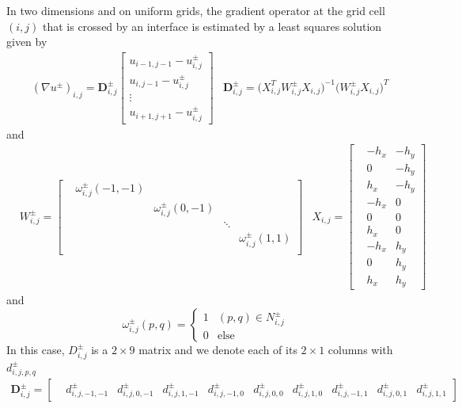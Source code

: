 \documentclass{elsarticle}
\begin{document}
In two dimensions and on uniform grids, the gradient operator at the grid cell $(i,j)$ that is crossed by an interface is estimated by a least squares solution given by
\begin{align*}
&(\nabla u^\pm)_{i,j} = \mathbf{D}^\pm_{i,j} \begin{bmatrix}
u_{i-1,j-1} - u^\pm_{i,j}\\
u_{i,j-1} - u^\pm_{i,j}\\
\vdots \\
u_{i+1,j+1} - u^\pm_{i,j}
\end{bmatrix} &\mathbf{D}^\pm_{i,j} = \big(X^T_{i,j} W^\pm_{i,j} X_{i,j} \big)^{-1} \big( W^\pm_{i,j} X_{i,j} \big)^T
\end{align*}
and 
\begin{align*}
& W^\pm_{i,j} = \begin{bmatrix}
&\omega^\pm_{i,j} (-1,-1) &  &  & \\
& &\omega^\pm_{i,j} (0,-1)  &  & \\
& &  & \ddots & \\
&&  &  & \omega^\pm_{i,j} (1,1) \\
\end{bmatrix}    & X_{i,j} = \begin{bmatrix}
& -h_x  & -h_y \\
& 0  & -h_y \\
& h_x  & -h_y \\
& -h_x  & 0 \\
& 0   & 0 \\
& h_x  & 0\\
&-h_x  & h_y\\
&0  & h_y\\
&h_x  & h_y
\end{bmatrix}
\end{align*}
and
\begin{equation}
\omega_{i,j}^\pm (p,q) = \begin{cases}
1 & (p,q)\in N_{i,j}^\pm \\
0 & \text{else}
\end{cases}
\end{equation}
In this case, $D^\pm_{i,j}$ is a $2\times 9$ matrix and we denote each of its $2\times 1$ columns with $d^\pm_{i,j,p,q}$
\begin{align*}
\mathbf{D}^\pm_{i,j}  = \begin{bmatrix}
& d^\pm_{i,j,-1,-1} & d^\pm_{i,j,0,-1} & d^\pm_{i,j,1,-1} & d^\pm_{i,j,-1,0} & d^\pm_{i,j,0,0} & d^\pm_{i,j,1,0} & d^\pm_{i,j,-1,1} & d^\pm_{i,j,0,1} & d^\pm_{i,j,1,1}
\end{bmatrix}
\end{align*}
\end{document}
